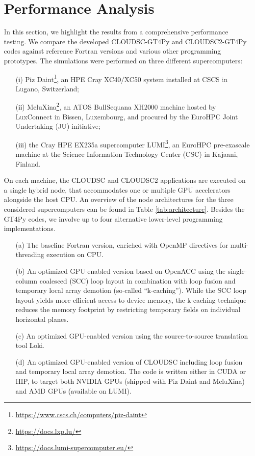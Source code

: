 \documentclass[main.tex]{subfiles}
\begin{document}
    \justifying

    \section{Performance Analysis}
    \label{section:performance-analysis}

    In this section, we highlight the results from a comprehensive performance testing. We compare the developed CLOUDSC-GT4Py and CLOUDSC2-GT4Py codes against reference Fortran versions and various other programming prototypes. The simulations were performed on three different supercomputers:
    \begin{itemize}
        \item[(i)] Piz Daint\footnote{\url{https://www.cscs.ch/computers/piz-daint}}, an HPE Cray XC40/XC50 system installed at CSCS in Lugano, Switzerland;
        \item[(ii)] MeluXina\footnote{\url{https://docs.lxp.lu/}}, an ATOS BullSequana XH2000 machine hosted by LuxConnect in Bissen, Luxembourg, and procured by the EuroHPC Joint Undertaking (JU) initiative;
        \item[(iii)] the Cray HPE EX235a supercomputer LUMI\footnote{\url{https://docs.lumi-supercomputer.eu/}}, an EuroHPC pre-exascale machine at the Science Information Technology Center (CSC) in Kajaani, Finland.
    \end{itemize}
    On each machine, the CLOUDSC and CLOUDSC2 applications are executed on a single hybrid node, that accommodates one or multiple GPU accelerators alongside the host CPU. An overview of the node architectures for the three considered supercomputers can be found in Table \ref{tab:architecture}. Besides the GT4Py codes, we involve up to four alternative lower-level programming implementations.
    \begin{itemize}
        \item[(a)] The baseline Fortran version, enriched with OpenMP directives for multi-threading execution on CPU.
        \item[(b)] An optimized GPU-enabled version based on OpenACC using the single-column coalesced (SCC) loop layout in combination with loop fusion and temporary local array demotion (so-called ``k-caching''). While the SCC loop layout yields more efficient access to device memory, the k-caching technique reduces the memory footprint by restricting temporary fields on individual horizontal planes.
        \item[(c)] An optimized GPU-enabled version using the source-to-source translation tool Loki.
        \item[(d)] An optimized GPU-enabled version of CLOUDSC including loop fusion and temporary local array demotion. The code is written either in CUDA or HIP, to target both NVIDIA GPUs (shipped with Piz Daint and MeluXina) and AMD GPUs (available on LUMI).
    \end{itemize}
\end{document}
